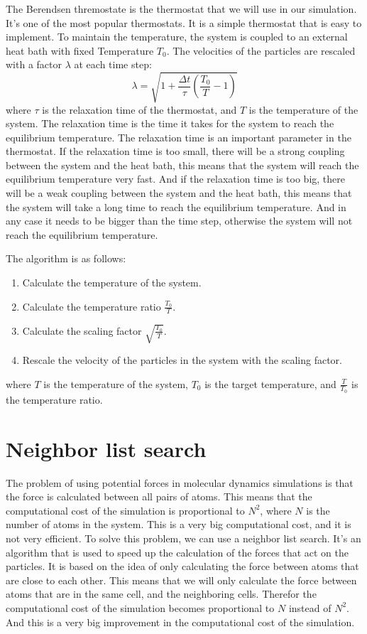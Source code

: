     The Berendsen thremostate is the thermostat that we will use in our simulation. It's one of the most popular thermostats. It is a simple thermostat that is easy to implement. To maintain the temperature, the system is coupled to an external heat bath with fixed Temperature $T_{0}$\cite{berendsen1984molecular}. The
    velocities of the particles are rescaled with a factor $\lambda$ at each time step:
    \begin{equation}
        \lambda = \sqrt{1+\frac{\Delta t}{\tau}\left(\frac{T_{0}}{T}-1\right)}
    \end{equation}
    where $\tau$ is the relaxation time of the thermostat, and $T$ is the temperature of the system. The relaxation time is the time it takes for the system to reach the equilibrium temperature. The relaxation time is an important parameter in the thermostat. If the relaxation time is too small, there will be a strong coupling between the system and the heat bath, this means that the system will reach the equilibrium temperature very fast. And if the relaxation time is too big, there will be a weak coupling between the system and the heat bath, this means that the system will take a long time to reach the equilibrium temperature.
    And in any case it needs to be bigger than the time step, otherwise the system will not reach the equilibrium temperature.

    The algorithm is as follows:
    \begin{enumerate}
        \item Calculate the temperature of the system.
        \item Calculate the temperature ratio $\frac{T_0}{T}$.
        \item Calculate the scaling factor $\sqrt{\frac{T_0}{T}}$.
        \item Rescale the velocity of the particles in the system with the scaling factor.
    \end{enumerate}
    where $T$ is the temperature of the system, $T_0$ is the target temperature, and $\frac{T}{T_0}$ is the temperature ratio.

\section{Neighbor list search}
    The problem of using potential forces in molecular dynamics simulations is that the force is calculated between all pairs of atoms. This means that the computational cost of the simulation is proportional to $N^2$, where $N$ is the number of atoms in the system. This is a very big computational cost, and it is not very efficient. 
    To solve this problem, we can use a neighbor list search. It's an algorithm that is used to speed up the calculation of the forces that act on the particles. 
    It is based on the idea of only calculating the force between atoms that are close to each other. This means that we will only calculate the force between atoms that are in the same cell, and the neighboring cells. Therefor the computational cost of the simulation becomes proportional to $N$ instead of $N^2$. And this is a very big improvement in the computational cost of the simulation. 
    
